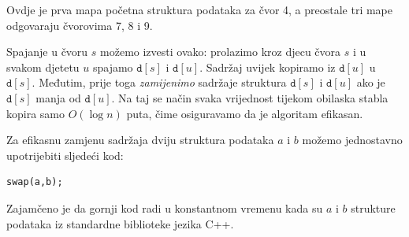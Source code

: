 \begin{center}
\end{center}

Ovdje je prva mapa početna struktura podataka
za čvor 4,
a preostale tri mape odgovaraju čvorovima 7, 8 i 9.

Spajanje u čvoru $s$ možemo izvesti ovako:
prolazimo kroz djecu čvora $s$
i u svakom djetetu $u$ spajamo $\texttt{d}[s]$
i $\texttt{d}[u]$.
Sadržaj uvijek kopiramo iz $\texttt{d}[u]$
u $\texttt{d}[s]$.
Međutim, prije toga \emph{zamijenimo}
sadržaje struktura $\texttt{d}[s]$ i $\texttt{d}[u]$
ako je $\texttt{d}[s]$ manja od $\texttt{d}[u]$.
Na taj se način svaka vrijednost tijekom obilaska stabla
kopira samo $O(\log n)$ puta,
čime osiguravamo da je algoritam efikasan.

Za efikasnu zamjenu sadržaja dviju struktura podataka $a$ i $b$
možemo jednostavno upotrijebiti sljedeći kod:
\begin{lstlisting}
swap(a,b);
\end{lstlisting}
Zajamčeno je da gornji kod radi u konstantnom vremenu
kada su $a$ i $b$ strukture podataka iz standardne biblioteke jezika C++.

